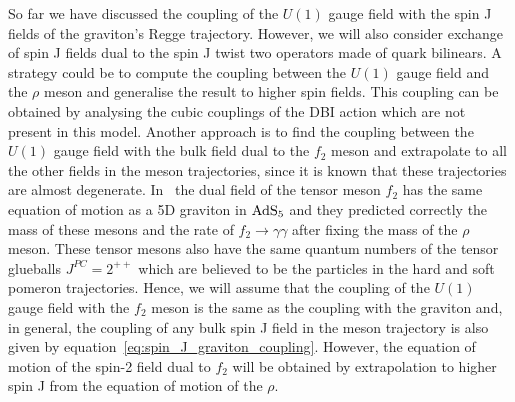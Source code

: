 \documentclass[a4paper,12pt]{article}
\begin{document}
So far we have discussed the coupling of the $U(1)$ gauge field with the spin J fields of the graviton's Regge trajectory. However, we will also consider exchange of spin J fields dual to the spin J twist two operators made of quark bilinears. A strategy could be to compute the coupling between the $U(1)$ gauge field and the $\rho$ meson and generalise the result to higher spin fields. This coupling can be obtained by analysing the cubic couplings of the DBI action which are not present in this model. Another approach is to find the coupling between the $U(1)$ gauge field with the bulk field dual to the $f_2$ meson and extrapolate to all the other fields in the meson trajectories, since it is known that these trajectories are almost degenerate. In~\cite{Katz:2005ir} the dual field of the tensor meson $f_2$ has the same equation of motion as a 5D graviton in $\rm{AdS}_5$ and they predicted correctly the mass of these mesons and the rate of $f_2 \to \gamma \gamma$ after fixing the mass of the $\rho$ meson. These tensor mesons also have the same quantum numbers of the tensor glueballs  $J^{PC} = 2^{++}$ which are believed to be the particles in the hard and soft pomeron trajectories. Hence, we will assume that the coupling of the  $U(1)$ gauge field with the $f_2$ meson is the same as the coupling with the graviton and, in general, the coupling of any bulk spin J field in the meson trajectory is also given by equation~\ref{eq:spin_J_graviton_coupling}. However, the equation of motion of the spin-2 field dual to $f_2$ will be obtained by extrapolation to higher spin J from the equation of motion of the $\rho$.
\end{document}
